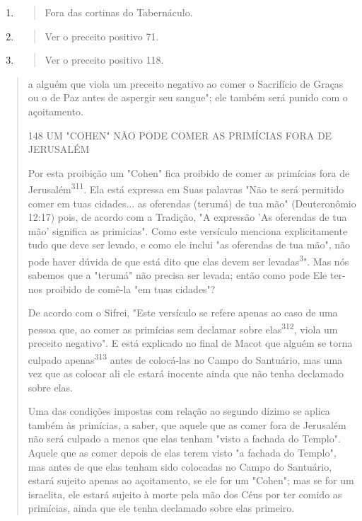 \begin{enumerate}
\def\labelenumi{\arabic{enumi}.}
\setcounter{enumi}{306}
\item
  \begin{quote}
  Fora das cortinas do Tabernáculo.
  \end{quote}
\item
  \begin{quote}
  Ver o preceito positivo 71.
  \end{quote}
\item
  \begin{quote}
  Ver o preceito positivo 118.
  \end{quote}
\end{enumerate}

\begin{quote}a alguém que viola um preceito negativo ao comer o Sacrifício de Graças
ou o de Paz antes de aspergir seu sangue"; ele também será punido com o
açoitamento.

148 UM "COHEN" NÃO PODE COMER AS PRIMÍCIAS FORA DE JERUSALÉM

Por esta proibição um "Cohen" fica proibido de comer as primícias fora
de Jerusalém\textsuperscript{311}. Ela está expressa em Suas palavras
"Não te será permiti­do comer em tuas cidades... as oferendas (terumá)
de tua mão" (Deuteronômio 12:17) pois, de acordo com a Tradição, "A
expressão 'As oferendas de tua mão' significa as primícias". Como este
versículo menciona explicitamente tudo que deve ser levado, e como ele
inclui "as oferendas de tua mão", não pode haver dúvida de que está dito
que elas devem ser levadas\textsuperscript{3}". Mas nós sabemos que a
"terumá" não precisa ser levada; então como pode Ele ter-nos proibido de
comê-la "em tuas cidades"?

De acordo com o Sifrei, "Este versículo se refere apenas ao caso de uma
pessoa que, ao comer as primícias sem declamar sobre
elas\textsuperscript{312}, viola um preceito negativo". E está explicado
no final de Macot que alguém se torna cul­pado
apenas\textsuperscript{313} antes de colocá-las no Campo do Santuário,
mas uma vez que as colocar ali ele estará inocente ainda que não tenha
declamado sobre elas.

Uma das condições impostas com relação ao segundo dízimo se aplica
também às primícias, a saber, que aquele que as comer fora de Jerusalém
não será culpado a menos que elas tenham "visto a fachada do Templo".
Aquele que as comer depois de elas terem visto "a fachada do Templo",
mas antes de que elas tenham sido colocadas no Campo do Santuário,
estará sujeito apenas ao açoitamento, se ele for um "Cohen"; mas se for
um israelita, ele estará sujei­to à morte pela mão dos Céus por ter
comido as primícias, ainda que ele tenha declamado sobre elas primeiro.


\end{quote}
